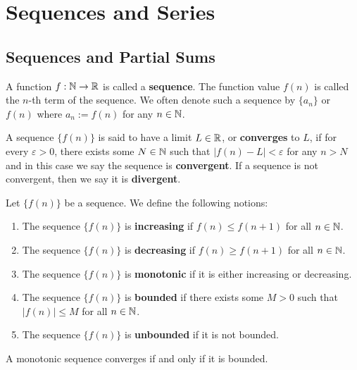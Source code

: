     \chapter{Sequences and Series}
    \section{Sequences and Partial Sums}
    \begin{definitionenv}
        A function $f:\mathbb{N} \to \mathbb{R}$ is called a \textbf{sequence}. The function value $f(n)$ is called the $n$-th term of the sequence. We often denote such a sequence by $\{a_n\}$ or $f(n)$ where $a_n := f(n)$ for any $n\in \mathbb{N}$.
    \end{definitionenv}
    \begin{definitionenv}
        A sequence $\{f(n)\}$ is said to have a limit $L\in \mathbb{R}$, or \textbf{converges} to $L$, if for every $\varepsilon > 0$, there exists some $N\in \mathbb{N}$ such that $|f(n) - L| < \varepsilon$ for any $n > N$ and in this case we say the sequence is \textbf{convergent}. If a sequence is not convergent, then we say it is \textbf{divergent}.
    \end{definitionenv}
    \begin{definitionenv}
        Let \(\{f(n)\}\) be a sequence. We define the following notions:
        \begin{enumerate}
            \item The sequence \(\{f(n)\}\) is \textbf{increasing} if \(f(n)\le f(n+1)\) for all \(n\in\mathbb{N}\).

            \item The sequence \(\{f(n)\}\) is \textbf{decreasing} if \(f(n)\ge f(n+1)\) for all \(n\in\mathbb{N}\).

            \item The sequence \(\{f(n)\}\) is \textbf{monotonic} if it is either increasing or decreasing.

            \item The sequence \(\{f(n)\}\) is \textbf{bounded} if there exists some \(M>0\) such that \(|f(n)|\le M\) for all \(n\in\mathbb{N}\).

            \item The sequence \(\{f(n)\}\) is \textbf{unbounded} if it is not bounded.
        \end{enumerate}
    \end{definitionenv}
    \begin{theoremenv}
        A monotonic sequence converges if and only if it is bounded.
    \end{theoremenv}
